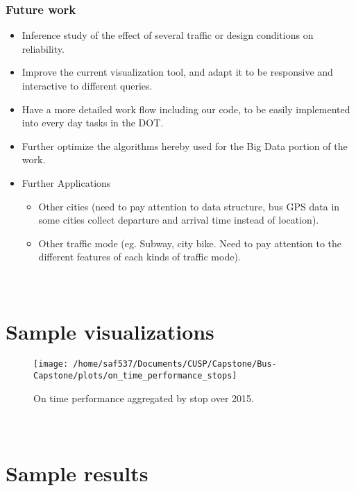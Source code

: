 \documentclass[12pt]{report}
\begin{document}
\subsubsection*{Future work}

\begin{itemize}
\item Inference study of the effect of several traffic or design conditions on reliability.
\item Improve the current visualization tool, and adapt it to be responsive and interactive to different queries.
\item Have a more detailed work flow including our code, to be easily implemented into every day tasks in the DOT.
\item Further optimize the algorithms hereby used for the Big Data portion of the work.
\item Further Applications
\begin{itemize}
\item Other cities (need to pay attention to data structure, bus GPS data in some cities collect departure and arrival time instead of location).
\item Other traffic mode (eg. Subway, city bike. Need to pay attention to the different features of each kinds of traffic mode).
\end{itemize}
\end{itemize}



\newpage
\appendix
\section*{\\Sample visualizations} \label{App:AppendixA}


\begin{figure}[!ht]
  \caption{On time performance aggregated by stop over 2015.}
  \centering
    \texttt{[image: /home/saf537/Documents/CUSP/Capstone/Bus-Capstone/plots/on\_time\_performance\_stops]}
\end{figure}


\section*{\\Sample results} \label{App:AppendixB}

\end{document}
